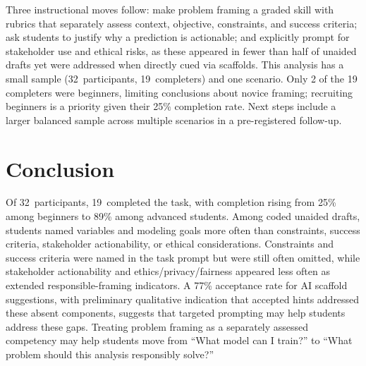 \documentclass[sigconf,screen,anonymous]{acmart}
\begin{document}
Three instructional moves follow: make problem framing a graded skill with rubrics that separately assess context, objective, constraints, and success criteria; ask students to justify why a prediction is actionable; and explicitly prompt for stakeholder use and ethical risks, as these appeared in fewer than half of unaided drafts yet were addressed when directly cued via scaffolds. This analysis has a small sample (32~participants, 19~completers) and one scenario. Only 2 of the 19 completers were beginners, limiting conclusions about novice framing; recruiting beginners is a priority given their 25\% completion rate. Next steps include a larger balanced sample across multiple scenarios in a pre-registered follow-up.

\vspace{-1.0em}
\section{Conclusion}
Of 32~participants, 19~completed the task, with completion rising from 25\% among beginners to 89\% among advanced students. Among coded unaided drafts, students named variables and modeling goals more often than constraints, success criteria, stakeholder actionability, or ethical considerations. Constraints and success criteria were named in the task prompt but were still often omitted, while stakeholder actionability and ethics/privacy/fairness appeared less often as extended responsible-framing indicators. A 77\% acceptance rate for AI scaffold suggestions, with preliminary qualitative indication that accepted hints addressed these absent components, suggests that targeted prompting may help students address these gaps. Treating problem framing as a separately assessed competency may help students move from ``What model can I train?'' to ``What problem should this analysis responsibly solve?''
\end{document}
